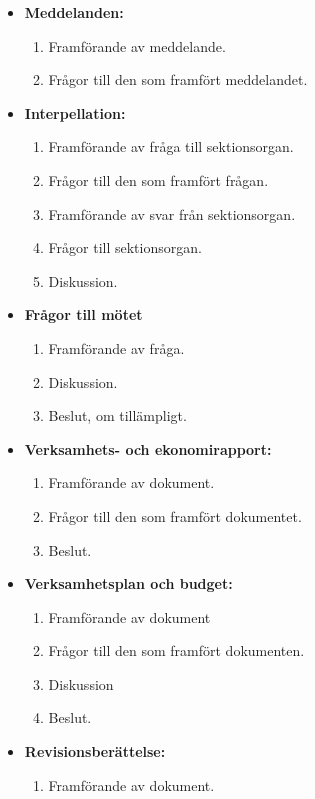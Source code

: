 \documentclass[11pt, includeaddress]{classes/cthit}
\begin{document}
\begin{itemize}
    \item \textbf{Meddelanden:}
    \begin{enumerate}
        \item Framförande av meddelande.
        \item Frågor till den som framfört meddelandet.
    \end{enumerate}
    \item \textbf{Interpellation:}
    \begin{enumerate}
        \item Framförande av fråga till sektionsorgan.
        \item Frågor till den som framfört frågan.
        \item Framförande av svar från sektionsorgan.
        \item Frågor till sektionsorgan.
        \item Diskussion.
    \end{enumerate}
    \item \textbf{Frågor till mötet}
    \begin{enumerate}
        \item Framförande av fråga.
        \item Diskussion.
        \item Beslut, om tillämpligt.
    \end{enumerate}
    \item \textbf{Verksamhets- och ekonomirapport:}
    \begin{enumerate}
        \item Framförande av dokument.
        \item Frågor till den som framfört dokumentet.
        \item Beslut.
    \end{enumerate}
    \item \textbf{Verksamhetsplan och budget:}
    \begin{enumerate}
        \item Framförande av dokument
        \item Frågor till den som framfört dokumenten.
        \item Diskussion
        \item Beslut.
    \end{enumerate}
    \item \textbf{Revisionsberättelse:}
    \begin{enumerate}
        \item Framförande av dokument.

\end{enumerate}
\end{itemize}
\end{document}
